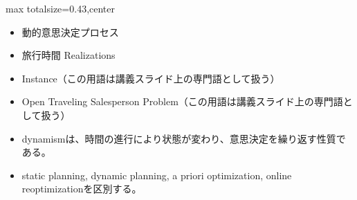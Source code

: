 \clearpage
{}
\begin{minipage}[t]{0.405\textwidth}
\begin{adjustbox}{max totalsize={\textwidth}{0.43\textheight},center}
\begin{minipage}{\textwidth}\scriptsize
{}\begin{itemize}
\item 動的意思決定プロセス
\item 旅行時間 Realizations
\item Instance（この用語は講義スライド上の専門語として扱う）
\item Open Traveling Salesperson Problem（この用語は講義スライド上の専門語として扱う）
\end{itemize}\begin{itemize}
\item dynamismは、時間の進行により状態が変わり、意思決定を繰り返す性質である。
\item static planning, dynamic planning, a priori optimization, online reoptimizationを区別する。
\end{itemize}
\end{minipage}
\end{adjustbox}
\end{minipage}\hfill
